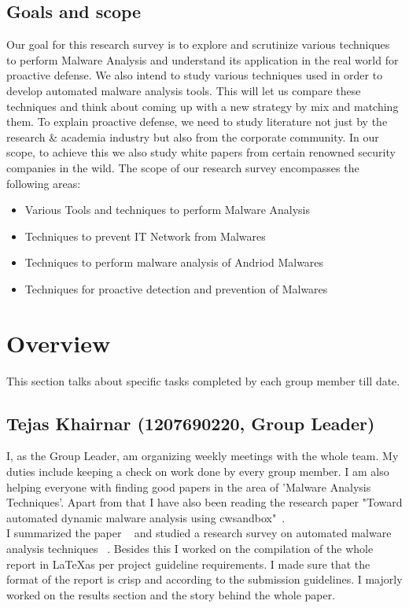 \documentclass[11pt]{article}
\begin{document}
	\subsection{Goals and scope}
	Our goal for this research survey is to explore and scrutinize various techniques to perform Malware Analysis and understand its application in the real world for proactive defense. We also intend to study various techniques used in order to develop automated malware analysis tools. This will let us compare these techniques and think about coming up with a new strategy by mix and matching them. To explain proactive defense, we need to study literature not just by the research \& academia industry but also from the corporate community. In our scope, to achieve this we also study white papers from certain renowned security companies in the wild. 
	The scope of our research survey encompasses the following areas:
	\begin{itemize}[noitemsep]
		\item{Various Tools and techniques to perform Malware Analysis}
		\item{Techniques to prevent IT Network from Malwares} 
		\item{Techniques to perform malware analysis of Andriod Malwares}
		\item{Techniques for proactive detection and prevention of Malwares}
	\end{itemize}


\section{Overview}
This section talks about specific tasks completed by each group member till date.
\subsection{Tejas Khairnar (1207690220, Group Leader)}
I, as the Group Leader, am organizing weekly meetings with the whole team. My duties include keeping a check on work done by every group member.
I am also helping everyone with finding good papers in the area of 'Malware Analysis Techniques'. Apart from that I have also been reading the research paper "Toward automated dynamic malware analysis using cwsandbox"~\cite{willems2007toward}. \\
I summarized the paper ~\cite{willems2007toward} and studied a research survey on automated malware analysis techniques ~\cite{egele2012survey}. Besides this I worked on the compilation of the whole report in \LaTeX as per project guideline requirements. I made sure that the format of the report is crisp and according to the submission guidelines. I majorly worked on the results section and the story behind the whole paper. 
\end{document}

